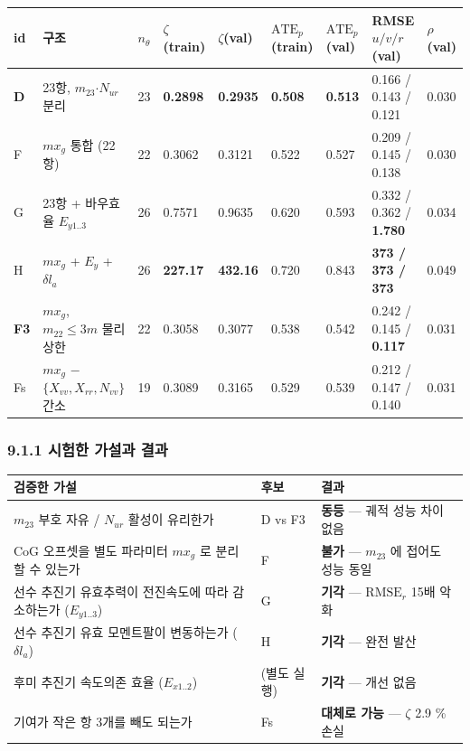 \documentclass[10pt,a4paper]{article}
\begin{document}
\begin{center}\scriptsize\setlength{\tabcolsep}{3pt}
\begin{tabular}{@{}lllllllll@{}}
\toprule
\textbf{id} & \textbf{구조} & \textbf{$n_\theta$} & \textbf{$\zeta$(train)} & \textbf{$\zeta$(val)} & \textbf{$\mathrm{ATE}_p$(train)} & \textbf{$\mathrm{ATE}_p$(val)} & \textbf{RMSE $u/v/r$ (val)} & \textbf{$\rho$(val)} \\
\midrule
\textbf{D} & 23항, $m_{23}$$\cdot$$N_{ur}$ 분리 & 23 & \textbf{0.2898} & \textbf{0.2935} & \textbf{0.508} & \textbf{0.513} & 0.166 / 0.143 / 0.121 & 0.030 \\
F & $m x_g$ 통합 (22항) & 22 & 0.3062 & 0.3121 & 0.522 & 0.527 & 0.209 / 0.145 / 0.138 & 0.030 \\
G & 23항 + 바우효율 $E_{y1..3}$ & 26 & 0.7571 & 0.9635 & 0.620 & 0.593 & 0.332 / 0.362 / \textbf{1.780} & 0.034 \\
H & $m x_g$ + $E_y$ + $\delta l_a$ & 26 & \textbf{227.17} & \textbf{432.16} & 0.720 & 0.843 & \textbf{373 / 373 / 373} & 0.049 \\
\textbf{F3} & $m x_g$, $m_{22} \le 3m$ 물리상한 & 22 & 0.3058 & 0.3077 & 0.538 & 0.542 & 0.242 / 0.145 / \textbf{0.117} & 0.031 \\
Fs & $m x_g$ $-$ $\{X_{vv}, X_{rr}, N_{vv}\}$ 간소 & 19 & 0.3089 & 0.3165 & 0.529 & 0.539 & 0.212 / 0.147 / 0.140 & 0.031 \\
\bottomrule
\end{tabular}
\end{center}

\subsubsection*{9.1.1 시험한 가설과 결과}

\begin{center}\footnotesize\setlength{\tabcolsep}{3pt}
\begin{tabular}{@{}lll@{}}
\toprule
\textbf{검증한 가설} & \textbf{후보} & \textbf{결과} \\
\midrule
$m_{23}$ 부호 자유 / $N_{ur}$ 활성이 유리한가 & D vs F3 & \textbf{동등} --- 궤적 성능 차이 없음 \\
CoG 오프셋을 별도 파라미터 $m x_g$ 로 분리할 수 있는가 & F & \textbf{불가} --- $m_{23}$ 에 접어도 성능 동일 \\
선수 추진기 유효추력이 전진속도에 따라 감소하는가 ($E_{y1..3}$) & G & \textbf{기각} --- $\mathrm{RMSE}_r$ 15배 악화 \\
선수 추진기 유효 모멘트팔이 변동하는가 ($\delta l_a$) & H & \textbf{기각} --- 완전 발산 \\
후미 추진기 속도의존 효율 ($E_{x1..2}$) & (별도 실행) & \textbf{기각} --- 개선 없음 \\
기여가 작은 항 3개를 빼도 되는가 & Fs & \textbf{대체로 가능} --- $\zeta$ 2.9 \% 손실 \\
\bottomrule
\end{tabular}
\end{center}
\end{document}
